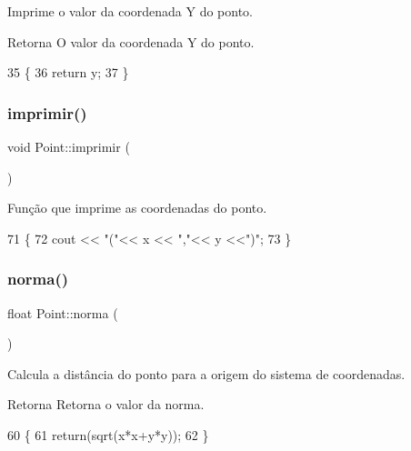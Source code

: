 Imprime o valor da coordenada Y do ponto. 

\begin{DoxyReturn}{Retorna}
O valor da coordenada Y do ponto. 
\end{DoxyReturn}

\begin{DoxyCode}
35 \{
36     \textcolor{keywordflow}{return} y;
37 \}
\end{DoxyCode}
\mbox{\label{class_point_a6c0289d808f65701bc0a28f6f282c85a}} 
\subsubsection{\texorpdfstring{imprimir()}{imprimir()}}
{\footnotesize\ttfamily void Point\+::imprimir (\begin{DoxyParamCaption}{ }\end{DoxyParamCaption})}



Função que imprime as coordenadas do ponto. 


\begin{DoxyCode}
71 \{
72     cout << \textcolor{stringliteral}{"("}<< x << \textcolor{stringliteral}{","}<< y <<\textcolor{stringliteral}{")"};
73 \}
\end{DoxyCode}
\mbox{\label{class_point_abd2618d1f505d9392893273a66e7c9b2}} 
\subsubsection{\texorpdfstring{norma()}{norma()}}
{\footnotesize\ttfamily float Point\+::norma (\begin{DoxyParamCaption}{ }\end{DoxyParamCaption})}



Calcula a distância do ponto para a origem do sistema de coordenadas. 

\begin{DoxyReturn}{Retorna}
Retorna o valor da norma. 
\end{DoxyReturn}

\begin{DoxyCode}
60 \{
61     \textcolor{keywordflow}{return}(sqrt(x*x+y*y));
62 \}
\end{DoxyCode}
\mbox{\label{class_point_a428a1676e2fdec6753c42011a1d59d18}} 

